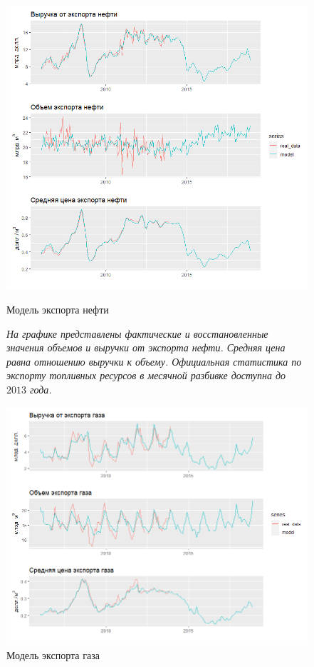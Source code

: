 \documentclass[a4paper, 14pt]{extarticle}
\begin{document}
\newpage

\begin{figure}[htp!]
	\centering
\includegraphics[width=\linewidth]{oil_model.png}
\caption{Модель экспорта нефти}\label{fi:5}
	\captionsetup{justification=centering,margin=0cm}
\caption*{\textit{На графике представлены фактические и восстановленные значения объемов и выручки от экспорта нефти. 
Средняя цена равна отношению выручки к объему.
Официальная статистика по экспорту топливных ресурсов в месячной разбивке доступна до $2013$ года.}}
\end{figure}


\begin{figure}[htp!]
	\centering
\includegraphics[width=19cm]{gas_model.png}
\caption{Модель экспорта газа}\label{fi:6}
\end{figure}
\end{document}
